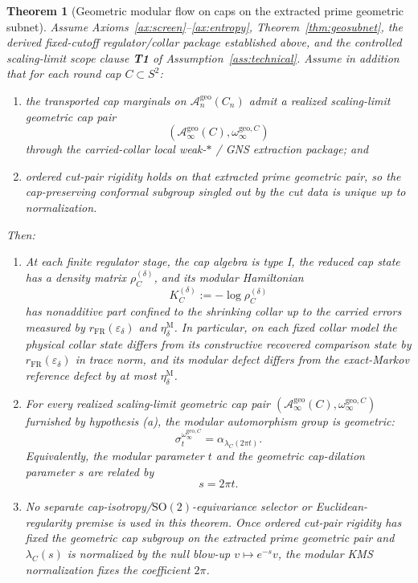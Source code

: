 \documentclass[11pt]{article}
\newtheorem{theorem}{Theorem}[section]
\begin{document}
\begin{theorem}[Geometric modular flow on caps on the extracted prime geometric subnet]\label{thm:bw}
Assume Axioms~\ref{ax:screen}--\ref{ax:entropy}, Theorem~\ref{thm:geosubnet}, the derived fixed-cutoff regulator/collar package established above, and the controlled scaling-limit scope clause \textbf{T1} of Assumption~\ref{ass:technical}. Assume in addition that for each round cap \(C\subset S^2\):
\begin{enumerate}[label=\textup{(\alph*)},leftmargin=2em]
\item the transported cap marginals on \(\mathcal A_n^{\mathrm{geo}}(C_n)\) admit a realized scaling-limit geometric cap pair
\[
(\mathcal A_\infty^{\mathrm{geo}}(C),\omega_\infty^{\mathrm{geo},C})
\]
through the carried-collar local weak-\(*\) / GNS extraction package; and
\item ordered cut-pair rigidity holds on that extracted prime geometric pair, so the cap-preserving conformal subgroup singled out by the cut data is unique up to normalization.
\end{enumerate}
Then:
\begin{enumerate}[label=\textup{(\roman*)},leftmargin=2em]
\item At each finite regulator stage, the cap algebra is type I, the reduced cap state has a density matrix \(\rho_C^{(\delta)}\), and its modular Hamiltonian
\[
K_C^{(\delta)}:=-\log \rho_C^{(\delta)}
\]
has nonadditive part confined to the shrinking collar up to the carried errors measured by \(r_{\mathrm{FR}}(\varepsilon_\delta)\) and \(\eta_\delta^{\mathrm M}\). In particular, on each fixed collar model the physical collar state differs from its constructive recovered comparison state by \(r_{\mathrm{FR}}(\varepsilon_\delta)\) in trace norm, and its modular defect differs from the exact-Markov reference defect by at most \(\eta_\delta^{\mathrm M}\).

\item For every realized scaling-limit geometric cap pair \((\mathcal A_\infty^{\mathrm{geo}}(C),\omega_\infty^{\mathrm{geo},C})\) furnished by hypothesis \textup{(a)}, the modular automorphism group is geometric:
\[
\sigma_t^{\omega_\infty^{\mathrm{geo},C}}
=
\alpha_{\lambda_C(2\pi t)}.
\]
Equivalently, the modular parameter \(t\) and the geometric cap-dilation parameter \(s\) are related by
\[
s=2\pi t.
\]

\item No separate cap-isotropy/\(\mathrm{SO}(2)\)-equivariance selector or Euclidean-regularity premise is used in this theorem. Once ordered cut-pair rigidity has fixed the geometric cap subgroup on the extracted prime geometric pair and \(\lambda_C(s)\) is normalized by the null blow-up \(v\mapsto e^{-s}v\), the modular KMS normalization fixes the coefficient \(2\pi\).


\end{enumerate}
\end{theorem}
\end{document}
